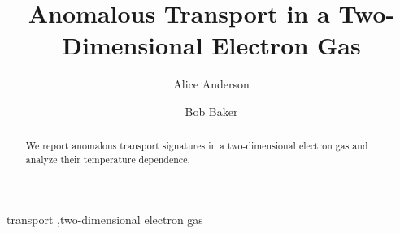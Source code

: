 \begin{frontmatter}
\title{Anomalous Transport in a Two-Dimensional Electron Gas}
\author[0,1]{Alice Anderson}
\author[1]{Bob Baker}
\begin{abstract}
We report anomalous transport signatures in a two-dimensional electron gas and analyze their temperature dependence.
\end{abstract}
\begin{keyword}
transport \sep two-dimensional electron gas
\end{keyword}
\end{frontmatter}
